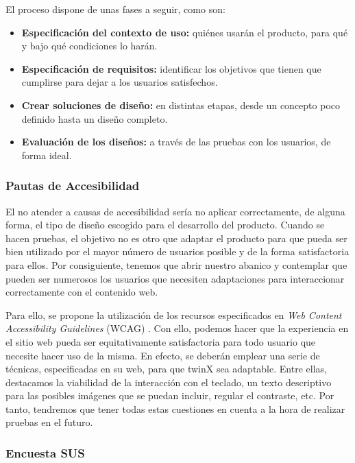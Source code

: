 El proceso dispone de unas fases a seguir, como son:
\begin{itemize}
	\item \textbf{Especificación del contexto de uso:} quiénes usarán el producto, para qué y bajo qué condiciones lo harán.
	\item \textbf{Especificación de requisitos:} identificar los objetivos que tienen que cumplirse para dejar a los usuarios satisfechos.
	\item \textbf{Crear soluciones de diseño:} en distintas etapas, desde un concepto poco definido hasta un diseño completo.
	\item \textbf{Evaluación de los diseños:} a través de las pruebas con los usuarios, de forma ideal.
\end{itemize}

\subsubsection{Pautas de Accesibilidad}
\label{subsec:accesibilidad}

El no atender a causas de accesibilidad sería no aplicar correctamente, de alguna forma, el tipo de diseño escogido para el desarrollo del producto. Cuando se hacen pruebas, el objetivo no es otro que adaptar el producto para que pueda ser bien utilizado por el mayor número de usuarios posible y de la forma satisfactoria para ellos. Por consiguiente, tenemos que abrir nuestro abanico y contemplar que pueden ser numerosos los usuarios que necesiten adaptaciones para interaccionar correctamente con el contenido web.

Para ello, se propone la utilización de los recursos especificados en \textit{Web Content Accessibility Guidelines} (WCAG) \cite{wcag}. Con ello, podemos hacer que la experiencia en el sitio web pueda ser equitativamente satisfactoria para todo usuario que necesite hacer uso de la misma. En efecto, se deberán emplear una serie de técnicas, especificadas en su web, para que twinX sea adaptable. Entre ellas, destacamos la viabilidad de la interacción con el teclado, un texto descriptivo para las posibles imágenes que se puedan incluir, regular el contraste, etc. Por tanto, tendremos que tener todas estas cuestiones en cuenta a la hora de realizar pruebas en el futuro.

\subsubsection{Encuesta SUS}

